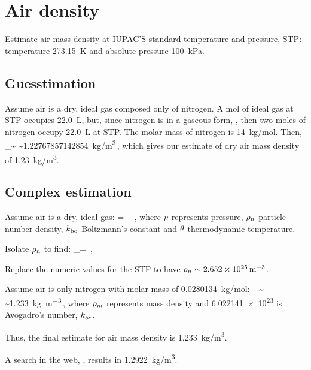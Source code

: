 \chapter*{Air density}
%
Estimate air mass density at IUPAC'S standard temperature and pressure, STP: temperature \SI{273.15}{K} and absolute pressure \SI{100}{kPa}. 


\section*{Guesstimation}
%
Assume air is a dry, ideal gas composed only of nitrogen. A mol of ideal gas at STP occupies \SI{22.0}{L}, but, since nitrogen is in a gaseous form, , then two moles of nitrogen occupy \SI{22.0}{L} at STP. The molar mass of nitrogen is \SI{14}{kg/mol}. Then,
%
\beq
    \dens_\mass \sim {}
                \sim \SI{1.22767857142854}{kg/m^3}\,,
\eeq
%
which gives our estimate of dry air mass density of \SI{1.23}{kg/m^3}.


\section*{Complex estimation}
%
Assume air is a dry, ideal gas:
%
\beq
    \press = \dens_\npart\kboltzmann\temp\,,
\eeq
%
where $p$ represents pressure, $\rho_n$ particle number density, $k_\text{bo}$ Boltzmann's constant and $\theta$ thermodynamic temperature.

Isolate $\rho_n$ to find:
%
\beq
    \dens_\npart = \dfrac{\press}{\kboltzmann\temp}\,,
\eeq

Replace the numeric values for the STP to have $\rho_n \sim \SI{2.652E25}{m^{-3}}$.

Assume air is only nitrogen with molar mass of \SI{0.0280134}{kg/mol}:
%
\beq
    \dens_\mass \sim {}
                \sim \SI{1.233}{kg.m^{-3}}\,,
\eeq
%
where $\rho_m$ represents mass density and \num{6.022141e23} is Avogadro's number, $k_\text{av}$.

Thus, the final estimate for air mass density is \SI{1.233}{kg/m^3}.

A search in the web, \citep{wiki:air}, results in \SI{1.2922}{kg/m^3}.
